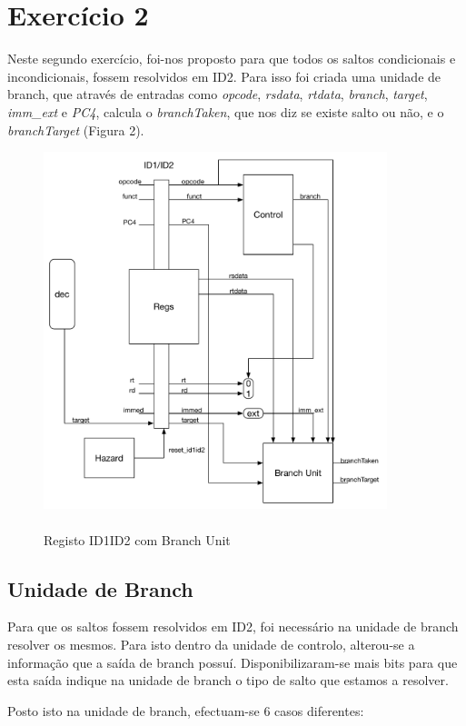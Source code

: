 \documentclass[pdftex,12pt,a4paper]{report}
\begin{document}
\newpage
\section{Exercício 2}

Neste segundo exercício, foi-nos proposto para que todos os saltos condicionais e incondicionais, fossem resolvidos em ID2. Para isso foi criada uma unidade de branch, que através de entradas como \textit{opcode}, \textit{rsdata}, \textit{rtdata}, \textit{branch}, \textit{target}, \textit{imm\_ext} e \textit{PC4}, calcula o \textit{branchTaken}, que nos diz se existe salto ou não, e o \textit{branchTarget} (Figura 2).

\begin{figure}[!htb]
\center
 \includegraphics[width=100mm,scale=1]{ID1ID2ex2.pdf}
 \caption{\\Registo ID1ID2 com Branch Unit}\label{fig:ex2RegID1ID2}
\end{figure}

\subsection{Unidade de Branch}

Para que os saltos fossem resolvidos em ID2, foi necessário na unidade de branch resolver os mesmos. Para isto dentro da unidade de controlo, alterou-se a informação que a saída de branch possuí. Disponibilizaram-se mais bits para que esta saída indique na unidade de branch o tipo de salto que estamos a resolver.

Posto isto na unidade de branch, efectuam-se 6 casos diferentes:
\end{document}
